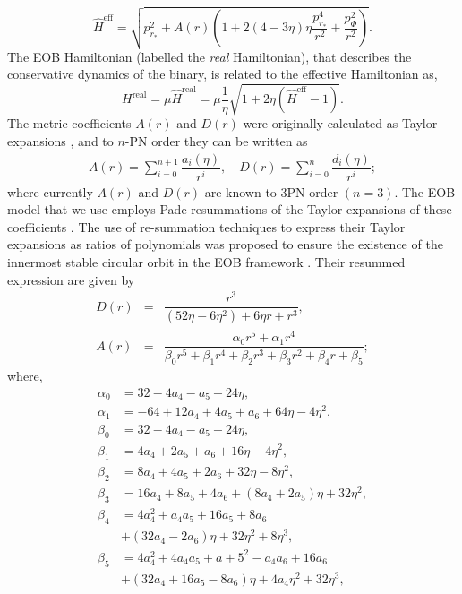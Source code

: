 \documentclass[aps,
prd,
amsmath,
amssymb,
twocolumn,
floatfix,
groupedaddress]{revtex4-1}
\newcommand{\Sum}{\displaystyle\sum\limits}
\newcommand{\eff}{\mathrm{eff}}
\newcommand{\real}{\mathrm{real}}
\def\l({\left(}
\def\r){\right)}
\begin{document}
\begin{equation}
\hat{H}^{\eff} = \sqrt{p^2_{r_*} + A(r) \left( 1 + 2(4 - 3\eta)\eta \dfrac{p_{r_*}^4}{r^2} + \dfrac{p^2_{\Phi}}{r^2} \right)}.
\end{equation}
The EOB Hamiltonian (labelled the \textit{real} Hamiltonian), that describes the conservative dynamics of the binary,  is related to the effective Hamiltonian as,
\begin{equation}
H^{\real} = \mu\hat{H}^{\real} = \mu\dfrac{1}{\eta} \sqrt{1 + 2\eta (\hat{H}^{\eff} - 1)}.
\end{equation}
The metric coefficients $A(r)$ and $D(r)$ were originally calculated as Taylor expansions \cite{EOBOriginalBuonannoDamour,PadeAD}, and to $n$-PN order they can be written as
\begin{eqnarray}
A(r) = \Sum^{n+1}_{i=0} \dfrac{a_i (\eta)}{r^i},\quad
D(r) = \Sum^{n}_{i=0} \dfrac{d_i (\eta)}{r^i};
\end{eqnarray}
where currently $A(r)$ and $D(r)$ are known to 3PN order $\l(n=3\r)$.  The EOB model that we use employs Pade-resummations of the Taylor expansions of these coefficients \citep{BuonannoEOBv2Main}. The use of re-summation techniques to express their Taylor expansions as ratios of polynomials was proposed to ensure the existence of the innermost stable circular orbit in the EOB framework \citep{PadeAD}. Their resummed expression are given by \citep{BuonannoEOBv2Main}
\begin{eqnarray*}
D(r) &=& \dfrac{r^3}{(52\eta - 6\eta^2) + 6\eta r + r^3},\\
A(r) &=& \dfrac{\alpha_0 r^5 + \alpha_1 r^4}{\beta_0 r^5 + \beta_1 r^4 + \beta_2 r^3 + \beta_3 r^2 + \beta_4 r +\beta_5};
\end{eqnarray*}
where,
\begin{equation}
\begin{split}
\alpha_0 &= 32 - 4a_4 - a_5 - 24\eta ,\\
\alpha_1 &= -64 + 12a_4 + 4a_5 + a_6 + 64\eta - 4\eta^2 ,\\
\beta_0 &= 32 - 4a_4 - a_5 - 24\eta ,\\
\beta_1 &= 4a_4 + 2a_5 + a_6 + 16\eta - 4\eta^2 ,\\
\beta_2 &= 8a_4 + 4a_5 + 2a_6 + 32\eta - 8\eta^2 ,\\
\beta_3 &= 16a_4 + 8a_5 + 4a_6 + \left(8a_4 + 2a_5\right)\eta + 32\eta^2 ,\\
\beta_4 &= 4a_4^2 + a_4a_5 + 16a_5 + 8a_6\\ 
             &+ \left(32a_4 - 2a_6\right)\eta + 32\eta^2 + 8\eta^3 ,\\
\beta_5 &= 4a_4^2 + 4a_4a_5 + a+5^2 - a_4a_6 + 16a_6\\
             &+ \left(32a_4 + 16a_5 - 8a_6\right)\eta + 4a_4\eta^2 + 32\eta^3 ,
\end{split}
\end{equation}
\end{document}
